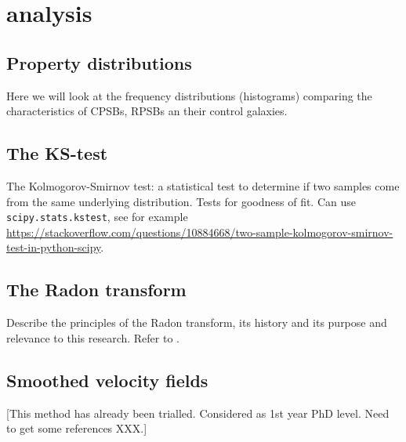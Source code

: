 \section{analysis}
\label{sec:analysis}

\subsection{Property distributions}
Here we will look at the frequency distributions (histograms) comparing the characteristics of CPSBs, RPSBs an their control galaxies.

\subsection{The KS-test}
The Kolmogorov-Smirnov test: a statistical test to determine if two samples come from the same underlying distribution. Tests for goodness of fit. Can use \texttt{scipy.stats.kstest}, see for example \url{https://stackoverflow.com/questions/10884668/two-sample-kolmogorov-smirnov-test-in-python-scipy}.

\subsection{The Radon transform}
Describe the principles of the Radon transform, its history and its purpose and relevance to this research. Refer to \cite{2018MNRAS.480.2217S}.

\subsection{Smoothed velocity fields}
[This method has already been trialled. Considered as 1st year PhD level. Need to get some references XXX.]